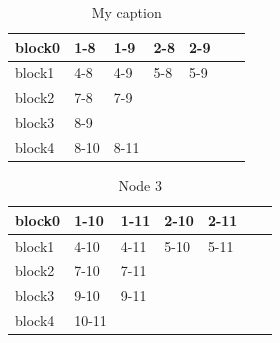 \documentclass[a4paper]{article}
\begin{document}
\begin{table}[]
\centering
\caption{My caption}
\label{my-label}
\begin{tabular}{l|llllll}
block0 & 1-8  & 1-9  & 2-8 & 2-9 &  &  \\ \hline
block1 & 4-8  & 4-9  & 5-8 & 5-9 &  &  \\ \hline
block2 & 7-8  & 7-9  &     &     &  &  \\ \hline
block3 & 8-9  &      &     &     &  &  \\ \hline
block4 & 8-10 & 8-11 &     &     &  & 
\end{tabular}
\end{table}

\begin{table}[]
\centering
\caption{Node 3}
\label{my-label}
\begin{tabular}{l|llllll}
block0 & 1-10  & 1-11 & 2-10 & 2-11 &  &  \\ \hline
block1 & 4-10  & 4-11 & 5-10 & 5-11 &  &  \\ \hline
block2 & 7-10  & 7-11 &      &      &  &  \\ \hline
block3 & 9-10  & 9-11 &      &      &  &  \\ \hline
block4 & 10-11 &      &      &      &  & 
\end{tabular}
\end{table}

\printbibliography 
\end{document}
